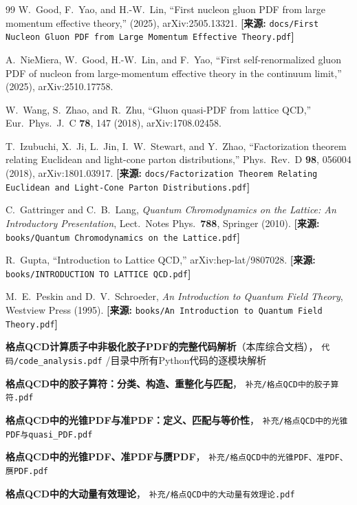 \documentclass[12pt,a4paper]{ctexart}
\theoremstyle{definition}
\begin{document}
\begin{thebibliography}{99}
W.~Good, F.~Yao, and H.-W.~Lin,
``First nucleon gluon PDF from large momentum effective theory,''
(2025), arXiv:2505.13321.
\quad\textbf{[来源:} \texttt{docs/First Nucleon Gluon PDF from Large Momentum Effective Theory.pdf}\textbf{]}

A.~NieMiera, W.~Good, H.-W.~Lin, and F.~Yao,
``First self-renormalized gluon PDF of nucleon from large-momentum effective theory in the continuum limit,''
(2025), arXiv:2510.17758.

W.~Wang, S.~Zhao, and R.~Zhu,
``Gluon quasi-PDF from lattice QCD,''
Eur.\ Phys.\ J.\ C \textbf{78}, 147 (2018), arXiv:1708.02458.

T.~Izubuchi, X.~Ji, L.~Jin, I.~W.~Stewart, and Y.~Zhao,
``Factorization theorem relating Euclidean and light-cone parton distributions,''
Phys.\ Rev.\ D \textbf{98}, 056004 (2018), arXiv:1801.03917.
\quad\textbf{[来源:} \texttt{docs/Factorization Theorem Relating Euclidean and Light-Cone Parton Distributions.pdf}\textbf{]}

C.~Gattringer and C.~B.~Lang,
\textit{Quantum Chromodynamics on the Lattice: An Introductory Presentation},
Lect.\ Notes Phys.\ \textbf{788}, Springer (2010).
\quad\textbf{[来源:} \texttt{books/Quantum Chromodynamics on the Lattice.pdf}\textbf{]}

R.~Gupta,
``Introduction to Lattice QCD,''
arXiv:hep-lat/9807028.
\quad\textbf{[来源:} \texttt{books/INTRODUCTION TO LATTICE QCD.pdf}\textbf{]}

M.~E.~Peskin and D.~V.~Schroeder,
\textit{An Introduction to Quantum Field Theory},
Westview Press (1995).
\quad\textbf{[来源:} \texttt{books/An Introduction to Quantum Field Theory.pdf}\textbf{]}

\textbf{格点QCD计算质子中非极化胶子PDF的完整代码解析}（本库综合文档），
\texttt{代码/code\_analysis.pdf}
/目录中所有Python代码的逐模块解析

\textbf{格点QCD中的胶子算符：分类、构造、重整化与匹配}，
\texttt{补充/格点QCD中的胶子算符.pdf}

\textbf{格点QCD中的光锥PDF与准PDF：定义、匹配与等价性}，
\texttt{补充/格点QCD中的光锥PDF与quasi\_PDF.pdf}

\textbf{格点QCD中的光锥PDF、准PDF与赝PDF}，
\texttt{补充/格点QCD中的光锥PDF、准PDF、赝PDF.pdf}

\textbf{格点QCD中的大动量有效理论}，
\texttt{补充/格点QCD中的大动量有效理论.pdf}


\end{thebibliography}
\end{document}
